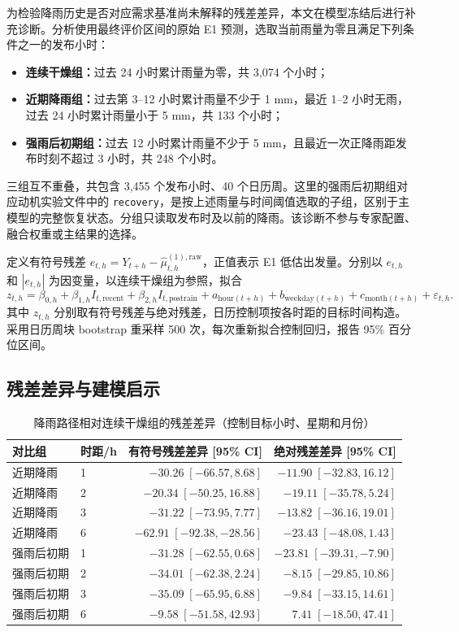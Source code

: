 \documentclass[UTF8,11pt,a4paper]{ctexart}
\begin{document}
为检验降雨历史是否对应需求基准尚未解释的残差差异，本文在模型冻结后进行补充诊断。分析使用最终评价区间的原始 E1 预测，选取当前雨量为零且满足下列条件之一的发布小时：
\begin{itemize}
  \item \textbf{连续干燥组：}过去 24 小时累计雨量为零，共 3,074 个小时；
  \item \textbf{近期降雨组：}过去第 3--12 小时累计雨量不少于 1 mm，最近 1--2 小时无雨，过去 24 小时累计雨量小于 5 mm，共 133 个小时；
  \item \textbf{强雨后初期组：}过去 12 小时累计雨量不少于 5 mm，且最近一次正降雨距发布时刻不超过 3 小时，共 248 个小时。
\end{itemize}
三组互不重叠，共包含 3,455 个发布小时、40 个日历周。这里的强雨后初期组对应动机实验文件中的 \texttt{recovery}，是按上述雨量与时间阈值选取的子组，区别于主模型的完整恢复状态。分组只读取发布时及以前的降雨。该诊断不参与专家配置、融合权重或主结果的选择。

定义有符号残差 $e_{t,h}=Y_{t+h}-\widehat\mu^{(1),\mathrm{raw}}_{t,h}$，正值表示 E1 低估出发量。分别以 $e_{t,h}$ 和 $|e_{t,h}|$ 为因变量，以连续干燥组为参照，拟合
\begin{equation}
 z_{t,h}=\beta_{0,h}+\beta_{1,h}I_{t,\mathrm{recent}}
 +\beta_{2,h}I_{t,\mathrm{postrain}}
 +a_{\mathrm{hour}(t+h)}+b_{\mathrm{weekday}(t+h)}
 +c_{\mathrm{month}(t+h)}+\varepsilon_{t,h}.
\end{equation}
其中 $z_{t,h}$ 分别取有符号残差与绝对残差，日历控制项按各时距的目标时间构造。采用日历周块 bootstrap 重采样 500 次，每次重新拟合控制回归，报告 95\% 百分位区间。

\subsection{残差差异与建模启示}

\begin{table}[H]
\centering
\caption{降雨路径相对连续干燥组的残差差异（控制目标小时、星期和月份）}
\label{tab:motivation}
\small
\begin{tabular}{llrr}
\toprule
对比组 & 时距/h & 有符号残差差异 [95\% CI] & 绝对残差差异 [95\% CI]\\
\midrule
近期降雨 & 1 & $-30.26\;[-66.57,8.68]$ & $-11.90\;[-32.83,16.12]$\\
近期降雨 & 2 & $-20.34\;[-50.25,16.88]$ & $-19.11\;[-35.78,5.24]$\\
近期降雨 & 3 & $-31.22\;[-73.95,7.77]$ & $-13.82\;[-36.16,19.01]$\\
近期降雨 & 6 & $-62.91\;[-92.38,-28.56]$ & $-23.43\;[-48.08,1.43]$\\
强雨后初期 & 1 & $-31.28\;[-62.55,0.68]$ & $-23.81\;[-39.31,-7.90]$\\
强雨后初期 & 2 & $-34.01\;[-62.38,2.24]$ & $-8.15\;[-29.85,10.86]$\\
强雨后初期 & 3 & $-35.09\;[-65.95,6.88]$ & $-9.84\;[-33.15,14.61]$\\
强雨后初期 & 6 & $-9.58\;[-51.58,42.93]$ & $7.41\;[-18.50,47.41]$\\
\bottomrule
\end{tabular}
\end{table}
\end{document}
